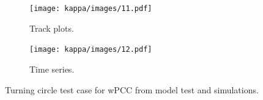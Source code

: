 \begin{figure}[h]
    \centering

    \begin{subfigure}[b]{\textwidth}
        \texttt{[image: kappa/images/11.pdf]}
        \caption{Track plots.}\label{fig:track-plot-testing-sim}
    \end{subfigure}
    \vfill
    \begin{subfigure}[b]{\textwidth}
        \texttt{[image: kappa/images/12.pdf]}
        \caption{Time series.}\label{\detokenize{06.10_results_wpcc:fig-testing-sim}}
    \end{subfigure}
        
    \caption{Turning circle test case for wPCC from model test and simulations.}
    \label{fig:wpcc_testing-sim}
\end{figure}

\FloatBarrier

